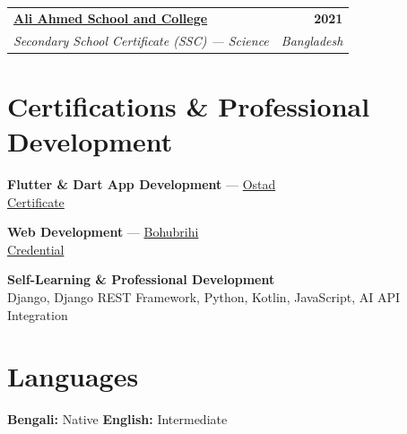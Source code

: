 \documentclass[10.5pt, a4paper]{article}
\makeatletter
\newcommand{\eduentry}[4]{%
  \begin{tabularx}{\linewidth}{@{}X r@{}}
    \textbf{#1} & \textbf{\small\color{cnavy}#2} \\[1pt]
    \textit{\small\color{csteel}#3} & \textit{\small\color{csteel}#4}
  \end{tabularx}%
}
\makeatother
\begin{document}
\vspace{6pt}

\eduentry{\href{http://aasac.edu.bd/}{Ali Ahmed School and College}}{2021}{Secondary School Certificate (SSC) --- Science}{Bangladesh}

\section{Certifications \& Professional Development}

\textbf{Flutter \& Dart App Development} --- \href{https://ostad.app/}{Ostad} \\
\href{https://ostad.app/share/certificate/c43942-md-saidur-rahman-bhuyan}{Certificate}

\vspace{5pt}

\textbf{Web Development} --- \href{https://bohubrihi.com/}{Bohubrihi} \\
\href{https://www.linkedin.com/in/saidur1004/overlay/Certifications/132641588/treasury/?profileId=ACoAAFvw44EBd0KjHnbL5Xfk4zXY-laSdkRnl2E}{Credential}

\vspace{5pt}

\textbf{Self-Learning \& Professional Development} \\
Django, Django REST Framework, Python, Kotlin, JavaScript, AI API Integration

\section{Languages}

\vspace{2pt}
{\small
\textbf{Bengali:} Native
\quad\textbullet\quad
\textbf{English:} Intermediate
}
\end{document}
